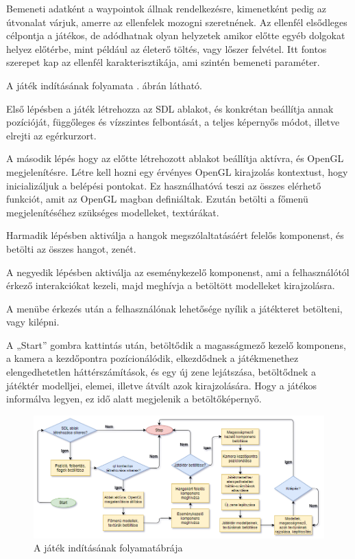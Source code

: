Bemeneti adatként a waypointok állnak rendelkezésre, kimenetként pedig az útvonalat várjuk, amerre az ellenfelek mozogni szeretnének. Az ellenfél elsődleges célpontja a játékos, de adódhatnak olyan helyzetek amikor előtte egyéb dolgokat helyez előtérbe, mint például az életerő töltés, vagy lőszer felvétel. Itt fontos szerepet kap az ellenfél karakterisztikája, ami szintén bemeneti paraméter.

\newpage
{}

A játék indításának folyamata . ábrán látható.

Első lépésben a játék létrehozza az SDL ablakot, és konkrétan beállítja annak pozícióját, függőleges és vízszintes felbontását, a teljes képernyős módot, illetve elrejti az egérkurzort.

A második lépés hogy az előtte létrehozott ablakot beállítja aktívra, és OpenGL megjelenítésre. Létre kell hozni egy érvényes OpenGL kirajzolás kontextust, hogy inicializáljuk a belépési pontokat. Ez használhatóvá teszi az összes elérhető funkciót, amit az OpenGL magban definiáltak. Ezután betölti a főmenü megjelenítéséhez szükséges modelleket, textúrákat.

Harmadik lépésben aktiválja a hangok megszólaltatásáért felelős komponenst, és betölti az összes hangot, zenét.

A negyedik lépésben aktiválja az eseménykezelő komponenst, ami a felhasználótól érkező interakciókat kezeli, majd meghívja a betöltött modelleket kirajzolásra.

A menübe érkezés után a felhasználónak lehetősége nyílik a játékteret betölteni, vagy kilépni. 

A „Start” gombra kattintás után, betöltődik a magasságmező kezelő komponens, a kamera a kezdőpontra pozícionálódik, elkezdődnek a játékmenethez elengedhetetlen háttérszámítások, és egy új zene lejátszása, betöltődnek a játéktér modelljei, elemei, illetve átvált azok kirajzolására. Hogy a játékos informálva legyen, ez idő alatt megjelenik a betöltőképernyő.

\begin{figure}[h]
\centering
\includegraphics[scale=0.46]{kepek/starting_diagram.png}
\caption{A játék indításának folyamatábrája}
\label{fig:starting}
\end{figure}

